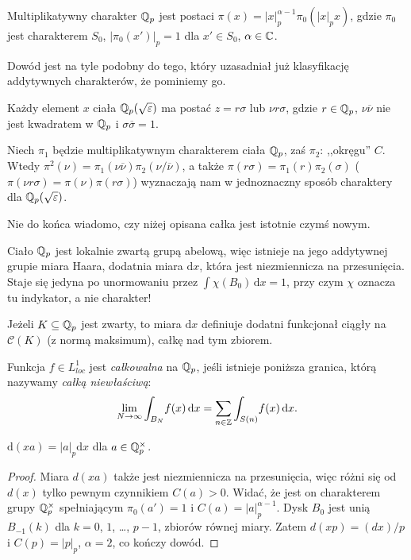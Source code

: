 \begin{fakt}
	Multiplikatywny charakter $\mathbb Q_p$ jest postaci $\pi(x) = |x|_p^{\alpha - 1} \pi_0(|x|_p x)$, gdzie $\pi_0$ jest charakterem $S_0$, $|\pi_0(x')|_p = 1$ dla $x' \in S_0$, $\alpha \in \mathbb C$.
\end{fakt}

Dowód jest na tyle podobny do tego, który uzasadniał już klasyfikację addytywnych charakterów, że pominiemy go.

Każdy element $x$ ciała $\mathbb Q_p (\sqrt{\varepsilon})$ ma postać $z = r \sigma$ lub $ \nu r \sigma$, gdzie $r \in \mathbb Q_p$, $\nu \overline \nu$ nie jest kwadratem w $\mathbb Q_p$ i $\sigma \overline \sigma = 1$.

\begin{fakt}
	Niech $\pi_1$ będzie multiplikatywnym charakterem ciała $\mathbb Q_p$, zaś $\pi_2$: ,,okręgu'' $C$.
	Wtedy $\pi^2(\nu) = \pi_1(\nu \overline \nu) \pi_2 (\nu / \overline \nu)$, a także $\pi(r \sigma) = \pi_1(r)\pi_2(\sigma)$ ($\pi(\nu r \sigma) = \pi(\nu)\pi(r\sigma)$) wyznaczają nam w jednoznaczny sposób charaktery dla $\mathbb Q_p(\sqrt \varepsilon)$.
\end{fakt}

Nie do końca wiadomo, czy niżej opisana całka jest istotnie czymś nowym.

Ciało $\mathbb Q_p$ jest lokalnie zwartą grupą abelową, więc istnieje na jego addytywnej grupie miara Haara, dodatnia miara $\textrm{d}x$, która jest niezmiennicza na przesunięcia.
Staje się jedyna po unormowaniu przez $\int \chi(B_0) \,\textrm{d}x = 1$, przy czym $\chi$ oznacza tu indykator, a nie charakter!

Jeżeli  $K \subseteq \mathbb Q_p$ jest zwarty, to miara $\textrm{d}x$ definiuje dodatni funkcjonał ciągły na $\mathcal C(K)$ (z normą maksimum), całkę nad tym zbiorem.

\begin{definicja}
	Funkcja $f \in L^1_{loc}$ jest \emph{całkowalna} na $\mathbb Q_p$, jeśli istnieje poniższa granica, którą nazywamy \emph{całką niewłaściwą}:
	\[
		\lim_{N \to \infty} \int_{B_N} \! f(x)\,\textrm{d}x = \sum_{n \in \mathbb Z} \int_{S(n)} \!f(x)\,\textrm{d}x.
	\]
\end{definicja}

\begin{fakt}
$\textrm{d}(xa) = |a|_p \textrm{d}x$ dla $a \in \mathbb Q_p^\times$.
\end{fakt}

\begin{proof}
	Miara $d(xa)$ także jest niezmiennicza na przesunięcia, więc różni się od $d(x)$ tylko pewnym czynnikiem $C(a) > 0$.
	Widać, że jest on charakterem grupy $\mathbb Q_p^\times$ spełniającym $\pi_0(a') = 1$ i $C(a) = |a|_p^{\alpha - 1}$.
	Dysk $B_0$ jest unią $B_{-1}(k)$ dla $k = 0$, $1$, \ldots, $p-1$, zbiorów równej miary.
	Zatem $d(xp) = (dx)/p$ i $C(p) = |p|_p$, $\alpha = 2$, co kończy dowód.
\end{proof}

